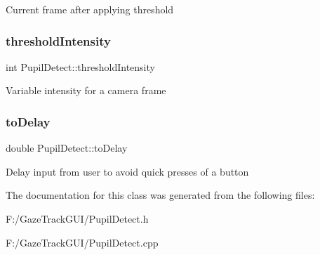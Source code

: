 Current frame after applying threshold \mbox{\label{class_pupil_detect_a0a13ac6ad9894befc3da11ef02add74f}} 
\subsubsection{\texorpdfstring{threshold\+Intensity}{thresholdIntensity}}
{\footnotesize\ttfamily int Pupil\+Detect\+::threshold\+Intensity\hspace{0.3cm}{\ttfamily [private]}}

Variable intensity for a camera frame \mbox{\label{class_pupil_detect_a2649d7093083c33607bd412707773a51}} 
\subsubsection{\texorpdfstring{to\+Delay}{toDelay}}
{\footnotesize\ttfamily double Pupil\+Detect\+::to\+Delay\hspace{0.3cm}{\ttfamily [private]}}

Delay input from user to avoid quick presses of a button 

The documentation for this class was generated from the following files\+:\begin{DoxyCompactItemize}
\item 
F\+:/\+Gaze\+Track\+G\+U\+I/Pupil\+Detect.\+h\item 
F\+:/\+Gaze\+Track\+G\+U\+I/Pupil\+Detect.\+cpp\end{DoxyCompactItemize}
